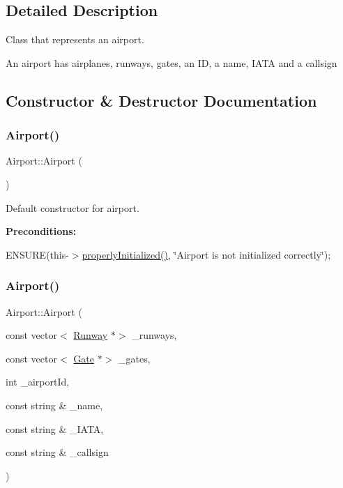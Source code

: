 \subsection{Detailed Description}
Class that represents an airport. 

An airport has airplanes, runways, gates, an ID, a name, I\+A\+TA and a callsign 

\subsection{Constructor \& Destructor Documentation}
\mbox{\label{class_airport_a2fc0f2402c94225b9deaf76176bb887f}} 
\subsubsection{\texorpdfstring{Airport()}{Airport()}\hspace{0.1cm}{\footnotesize\ttfamily [1/2]}}
{\footnotesize\ttfamily Airport\+::\+Airport (\begin{DoxyParamCaption}{ }\end{DoxyParamCaption})}



Default constructor for airport. 

{\bfseries Preconditions\+:}
\begin{DoxyItemize}
\item E\+N\+S\+U\+RE(this-\/$>$\mbox{\hyperlink{class_airport_aa13e68ac58e8875837fbe888325cfff6}{properly\+Initialized()}}, \char`\"{}\+Airport is not initialized correctly\char`\"{}); 
\end{DoxyItemize}\mbox{\label{class_airport_a153cf00d5a0e7a547da06e3a77da4d8a}} 
\subsubsection{\texorpdfstring{Airport()}{Airport()}\hspace{0.1cm}{\footnotesize\ttfamily [2/2]}}
{\footnotesize\ttfamily Airport\+::\+Airport (\begin{DoxyParamCaption}\item[{const vector$<$ \mbox{\hyperlink{class_runway}{Runway}} $\ast$$>$}]{\+\_\+runways,  }\item[{const vector$<$ \mbox{\hyperlink{class_gate}{Gate}} $\ast$$>$}]{\+\_\+gates,  }\item[{int}]{\+\_\+airport\+Id,  }\item[{const string \&}]{\+\_\+name,  }\item[{const string \&}]{\+\_\+\+I\+A\+TA,  }\item[{const string \&}]{\+\_\+callsign }\end{DoxyParamCaption})}



